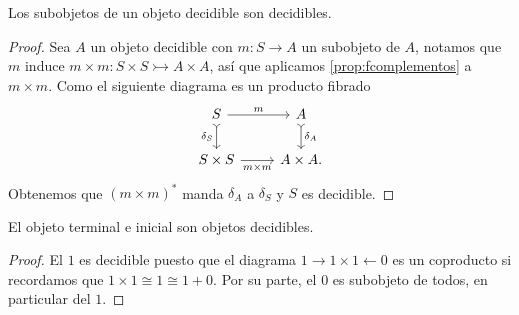 \begin{proposition}[label=prop:subdecidible]
  Los subobjetos de un objeto decidible son decidibles.
\end{proposition}
\begin{proof}
  Sea $A$ un objeto decidible con $m\colon S\to A$ un subobjeto de $A$, notamos que
  $m$ induce $m\times m\colon S\times S \rightarrowtail A\times A$, así que aplicamos
  \ref{prop:fcomplementos} a $m\times m$. Como el siguiente diagrama es un producto fibrado
  \begin{equation*}
    \begin{tikzcd}
        S\ar{r}{m} \ar[tail]{d}[swap]{\delta_S} & A\ar[tail]{d}{\delta_A}\\
        S\times S\ar{r}[swap]{m\times m} & A\times A.
    \end{tikzcd}
  \end{equation*}
  Obtenemos que $(m\times m)^*$ manda $\delta_A$ a $\delta_S$ y $S$ es decidible.
\end{proof}

\begin{corollary}[label=prop:cerounodiscreto]
  El objeto terminal e inicial son objetos decidibles.
\end{corollary}
\begin{proof}
  El $1$ es decidible puesto que el diagrama $1\to1\times1\leftarrow0$ es un coproducto
  si recordamos que $1\times1\cong1\cong1+0$. Por su parte, el $0$ es subobjeto de todos, 
  en particular del $1$.
\end{proof}

